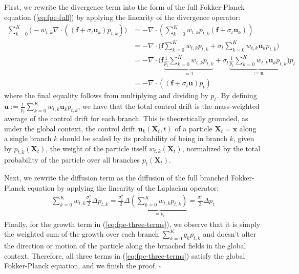\documentclass{article}
\begin{document}
First, we rewrite the divergence term into the form of the full Fokker-Planck equation (\ref{eq:fpe-full}) by applying the linearity of the divergence operator:
\begin{align}
    \sum_{k=0}^K\big(-w_{t,k}\nabla \cdot((\boldsymbol{f}+\sigma_t\boldsymbol{u}_k)p_{t,k})\big)&=-\nabla\cdot \left(\sum_{k=0}^K w_{t,k}p_{t,k}(\boldsymbol{f}+\sigma_t\boldsymbol{u}_k)\right)\nonumber\\
    &=-\nabla \cdot \bigg(\boldsymbol{f}\sum_{k=0}^K w_{t,k}p_{t,k}+\sigma_t\sum_{k=0}^K w_{t,k}\boldsymbol{u}_{k}p_{t,k}\bigg)\nonumber\\
    &=-\nabla \cdot \bigg(\boldsymbol{f}\underbrace{\frac{1}{p_t}\sum_{k=0}^K w_{t,k}p_{t,k}}_{=1}+\sigma_t\underbrace{\frac{1}{p_t}\sum_{k=0}^K w_{t,k}\boldsymbol{u}_{k}p_{t,k}}_{:=\boldsymbol{u}}\bigg)p_t\nonumber\\
    &=\boxed{-\nabla\cdot \left((\boldsymbol{f}+\sigma_t\boldsymbol{u})p_t\right)} 
\end{align}
where the final equality follows from multiplying and dividing by $p_t$. By defining $\boldsymbol{u}:=\frac{1}{p_t}\sum_{k=0}^K w_{t,k}\boldsymbol{u}_{k}p_{t,k}$, we have that the total control drift is the mass-weighted average of the control drift for each branch. This is theoretically grounded, as under the global context, the control drift $\boldsymbol{u}_{k}(\boldsymbol{X}_t,t)$ of a particle $\boldsymbol{X}_t=\boldsymbol{x}$ along a single branch $k$ should be scaled by its probability of being in branch $k$, given by $p_{t,k}(\boldsymbol{X}_t)$, the weight of the particle itself $w_{t,k}(\boldsymbol{X}_t)$, normalized by the total probability of the particle over all branches $p_t(\boldsymbol{X}_t)$.

Next, we rewrite the diffusion term as the diffusion of the full branched Fokker-Planck equation by applying the linearity of the Laplacian operator:
\begin{align}
    \sum_{k=0}^Kw_{t,k}\frac{\sigma_t^2}{2}\Delta p_{t,k}=\frac{\sigma_t^2}{2}\Delta \underbrace{\left(\sum_{k=0}^Kw_{t,k}p_{t,k}\right)}_{:=p_t}=\boxed{\frac{\sigma_t^2}{2}\Delta p_t}
\end{align}
Finally, for the growth term in (\ref{eq:fpe-three-terms}), we observe that it is simply the weighted sum of the growth over each branch $\sum_{k=0}^K g_{k}p_{t,k}$ and doesn't alter the direction or motion of the particle along the brnached fields in the global context. Therefore, all three terms in (\ref{eq:fpe-three-terms}) satisfy the global Fokker-Planck equation, and we finish the proof. \hfill $\square$
\end{document}
